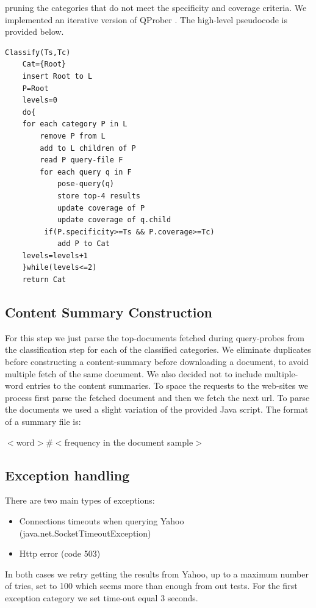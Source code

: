 \documentclass[11pt]{article}
\begin{document}
pruning the categories that do not meet the specificity and coverage criteria. We implemented an iterative version of QProber \cite{QProb}. The high-level pseudocode is provided below.

\begin{verbatim}
Classify(Ts,Tc)
    Cat={Root}
    insert Root to L
    P=Root
    levels=0
    do{
    for each category P in L
        remove P from L
        add to L children of P
        read P query-file F
        for each query q in F
            pose-query(q)
            store top-4 results
            update coverage of P
            update coverage of q.child
         if(P.specificity>=Ts && P.coverage>=Tc)
            add P to Cat
    levels=levels+1
    }while(levels<=2)
    return Cat
\end{verbatim}

\subsection{Content Summary Construction}

For this step we just parse the top-documents fetched during query-probes from the classification step for each of the classified categories. We eliminate duplicates before constructing 
a content-summary before downloading a document, to avoid multiple fetch of the same document. We also decided not to include multiple-word entries to the content summaries. To space the requests to the web-sites we process first parse the fetched document and then we fetch the next url. To parse the documents we used a slight variation of the provided Java script. The format of a summary file is:

$<$word$>\#<$frequency in the document sample$>$

\subsection{Exception handling}
There are two main types of exceptions:

\begin{itemize}
\item Connections timeouts when querying Yahoo (java.net.SocketTimeoutException)
\item Http error (code 503)
\end{itemize}

In both cases we retry getting the results from Yahoo, up to a maximum number of tries, set to 100 which seems more than enough from out tests. For the first exception category we set time-out equal 3 seconds.
\end{document}
